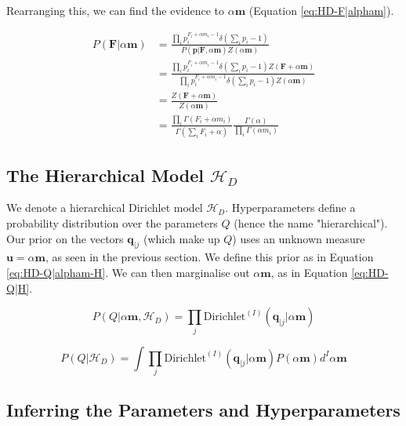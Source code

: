 \noindent Rearranging this, we can find the evidence to $\alpha\boldsymbol{m}$ (Equation \ref{eq:HD-F|alpham}).

\begin{align}
P(\boldsymbol{F}|\alpha\boldsymbol{m})&=\frac{\prod_{i}p_{i}^{F_{i}+\alpha m_{i}-1}\delta(\sum_{i}p_{i}-1)}{P(\boldsymbol{p}|\boldsymbol{F},\alpha\boldsymbol{m})Z(\alpha\boldsymbol{m})} \nonumber
\\
&=\frac{\prod_{i}p_{i}^{F_{i}+\alpha m_{i}-1}\delta(\sum_{i}p_{i}-1)Z(\boldsymbol{F}+\alpha\boldsymbol{m})}{\prod_{i}p_{i}^{F_{i}+\alpha m_{i}-1}\delta(\sum_{i}p_{i}-1)Z(\alpha\boldsymbol{m})} \nonumber
\\
&=\frac{Z(\boldsymbol{F}+\alpha\boldsymbol{m})}{Z(\alpha\boldsymbol{m})} \nonumber
\\
&=\frac{\prod_{i}\Gamma(F_{i}+\alpha m_{i})}{\Gamma(\sum_{i}F_{i}+\alpha)}\frac{\Gamma(\alpha)}{\prod_{i}\Gamma(\alpha m_{i})}
\label{eq:HD-F|alpham}
\end{align}

\subsection{The Hierarchical Model $\mathscr{H}_{D}$}

We denote a hierarchical Dirichlet model $\mathscr{H}_{D}$. Hyperparameters define a probability distribution over the parameters $Q$ (hence the name "hierarchical"). Our prior on the vectors $\boldsymbol{q}_{|j}$ (which make up $Q$) uses an unknown measure $\boldsymbol{u}=\alpha\boldsymbol{m}$, as seen in the previous section. We define this prior as in Equation \ref{eq:HD-Q|alpham-H}. We can then marginalise out $\alpha\boldsymbol{m}$, as in Equation \ref{eq:HD-Q|H}.

\begin{equation}
P(Q|\alpha\boldsymbol{m},\mathscr{H}_{D})=\prod_{j}\text{Dirichlet}^{(I)}(\boldsymbol{q}_{|j}|\alpha\boldsymbol{m})
\label{eq:HD-Q|alpham-H}
\end{equation}

\begin{equation}
P(Q|\mathscr{H}_{D})=\int\prod_{j}\text{Dirichlet}^{(I)}(\boldsymbol{q}_{|j}|\alpha\boldsymbol{m})P(\alpha\boldsymbol{m})d^{I}\alpha\boldsymbol{m}
\label{eq:HD-Q|H}
\end{equation}

\subsection{Inferring the Parameters and Hyperparameters}

